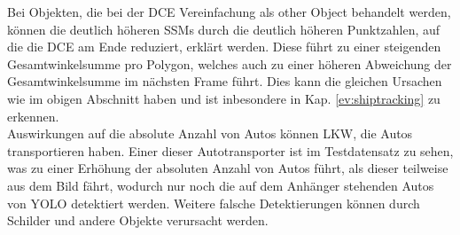 {	Bei Objekten, die bei der DCE Vereinfachung als \glqq other Object\grqq{} behandelt werden, können die deutlich höheren SSMs durch die deutlich höheren Punktzahlen, auf die die DCE am Ende reduziert, erklärt werden. Diese führt zu einer steigenden Gesamtwinkelsumme pro Polygon, welches auch zu einer höheren Abweichung der Gesamtwinkelsumme im nächsten Frame führt. Dies kann die gleichen Ursachen wie im obigen Abschnitt haben und ist inbesondere in Kap. \ref{ev:shiptracking} zu erkennen. \\
	
	Auswirkungen auf die absolute Anzahl von Autos können LKW, die Autos transportieren haben. Einer dieser Autotransporter ist im Testdatensatz zu sehen, was zu einer Erhöhung der absoluten Anzahl von Autos führt, als dieser teilweise aus dem Bild fährt, wodurch nur noch die auf dem Anhänger stehenden Autos von YOLO detektiert werden. Weitere falsche Detektierungen können durch Schilder und andere Objekte verursacht werden. \\


}
		



